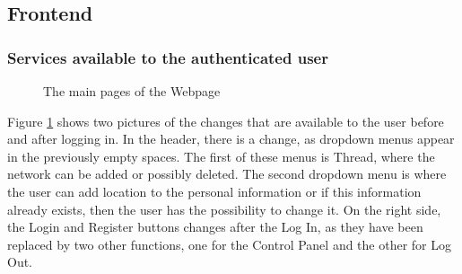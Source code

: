 \subsection{Frontend}

\subsubsection{Services available to the authenticated user}
\begin{figure}[!htb]
    \centering
    \caption{The main pages of the Webpage}
    \label{fig:welcomepage}
\end{figure}
Figure \ref{fig:welcomepage} shows two pictures of the changes that are available to the user before and after logging in. In the header, there is a change, as dropdown menus appear in the previously empty spaces. The first of these menus is Thread, where the network can be added or possibly deleted. The second dropdown menu is where the user can add location to the personal information or if this information already exists, then the user has the possibility to change it. On the right side, the Login and Register buttons changes after the Log In, as they have been replaced by two other functions, one for the Control Panel and the other for Log Out. 

